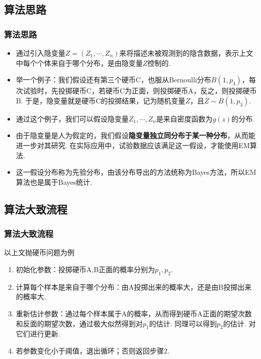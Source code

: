\documentclass[UTF8]{ctexbeamer}
\numberwithin{equation}{section}  %
\begin{document}
\subsection{算法思路}
\begin{frame}
    \frametitle{算法思路}

    \begin{itemize}
        \item<1-> 通过引入隐变量$Z = (Z_1,\cdots ,Z_n)$来将描述未被观测到的隐含数据，表示上文中每个个体来自于哪个分布，是由隐变量$Z$控制的.
        \item<2-> 举一个例子：我们假设还有第三个硬币C，也服从Bernoulli分布$B(1,p_3)$，每次试验时，先投掷硬币C，若硬币C为正面，则投掷硬币A，反之，则投掷硬币B. 于是，隐变量就是硬币C的投掷结果，记为随机变量$Z$，且$Z\sim B(1,p_3)$.
        \item<3-> 通过这个例子，我们可以假设隐变量$Z_1,\cdots, Z_n$是来自密度函数为$g(z)$的分布.
        \item<3-> 由于隐变量是人为假定的，我们假设\textbf{隐变量独立同分布于某一种分布}，从而能进一步对其研究. 在实际应用中，试验数据应该满足这一假设，才能使用EM算法.
        \item<3-> 这一假设分布称为先验分布，由该分布导出的方法统称为Bayes方法，所以EM算法也是属于Bayes统计.
    \end{itemize}

\end{frame}

\subsection{算法大致流程}
\begin{frame}
    \frametitle{算法大致流程}
    以上文抛硬币问题为例
    \begin{enumerate}[<+->]
        \item 初始化参数：投掷硬币A,B正面的概率分别为$p_1,p_2$.
        \item 计算每个样本是来自于哪个分布：由A投掷出来的概率大，还是由B投掷出来的概率大.
        \item 重新估计参数：通过每个样本属于A的概率，从而得到硬币A正面的期望次数和反面的期望次数，通过极大似然得到对$p_1$的估计. 同理可以得到$p_2$的估计. 对它们进行更新.
        \item 若参数变化小于阈值，退出循环；否则返回步骤2.
    \end{enumerate}
\end{frame}
\end{document}
